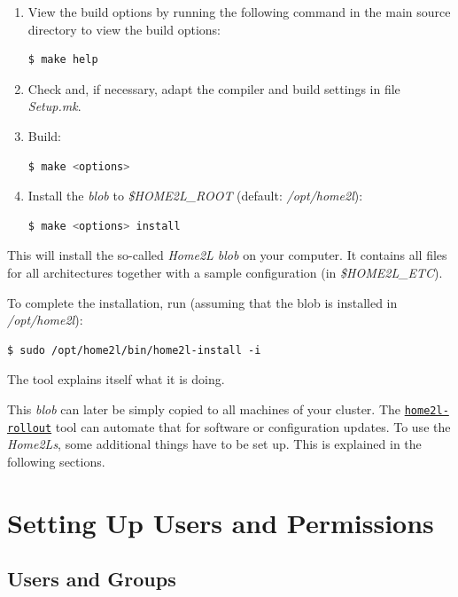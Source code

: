 \documentclass[12pt,english,parskip=half,headheight=19pt]{scrreprt}
\newcommand{\idx}[1]{#1\index{#1}}
\newcommand{\reftool}[1]{\hyperref[tool:#1]{\texttt{\idx{#1}}}}
\begin{document}
\begin{enumerate}
\item
  View the build options by running the following command in the main
  source directory to view the build options:
  \begin{lstlisting}[language=bash]
    $ make help
  \end{lstlisting}
\item
  Check and, if necessary, adapt the compiler and build settings in file \textit{Setup.mk}.
\item
  Build:
  \begin{lstlisting}[language=bash]
    $ make <options>
  \end{lstlisting}
\item
  Install the \textit{blob} to \textit{\$HOME2L\_ROOT} (default: \textit{/opt/home2l}):
  \begin{lstlisting}[language=bash]
    $ make <options> install
  \end{lstlisting}
\end{enumerate}

This will install the so-called \textit{Home2L blob} on your computer. It
contains all files for all architectures together with a sample
configuration (in \textit{\$HOME2L\_ETC}).

To complete the installation, run (assuming that the blob is installed in \textit{/opt/home2l}):
\begin{lstlisting}
$ sudo /opt/home2l/bin/home2l-install -i
\end{lstlisting}

The tool explains itself what it is doing.

This \textit{blob} can later be simply
copied to all machines of your cluster. The \reftool{home2l-rollout} tool
can automate that for software or configuration updates.
To use the \textit{Home2Ls}, some additional things have to be set up.
This is explained in the following sections.





\section{Setting Up Users and Permissions}
\label{sec:installing-users}



\subsection{Users and Groups}
\end{document}

